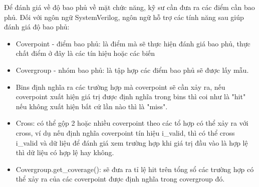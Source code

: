 Để đánh giá về độ bao phủ về mặt chức năng, kỹ sư cần đưa ra các điểm cần bao phủ. Đối với ngôn ngữ SystemVerilog, ngôn ngữ hỗ trợ các tính năng sau giúp đánh giá độ bao phủ:
\begin{itemize}
	\item Coverpoint - điểm bao phủ: là điểm mà sẽ thực hiện đánh giá bao phủ, thực chất điểm ở đây là các tín hiệu hoặc các biến
	\item Covergroup - nhóm bao phủ: là tập hợp các điểm bao phủ sẽ được lấy mẫu.
	\item Bins định nghĩa ra các trường hợp mà coverpoint sẽ cần xảy ra, nếu coverpoint xuất hiện giá trị được định nghĩa trong bins thì coi như là "hit" nếu không xuất hiện bất cứ lần nào thì là "miss".
	\item Cross: có thể gộp 2 hoặc nhiều coverpoint theo các tổ hợp có thể xảy ra với cross, ví dụ nếu định nghĩa coverpoint tín hiệu i\_valid, thì có thể cross i\_valid và dữ liệu để đánh giá xem trường hợp khi giá trị đầu vào là hợp lệ thì dữ liệu có hợp lệ hay không.
	\item Covergroup.get\_coverage(): sẽ đưa ra tỉ lệ hit trên tổng sổ các trường hợp có thể xảy ra của các coverpoint được định nghĩa trong covergroup đó.
\end{itemize}
%
%	
%
%




